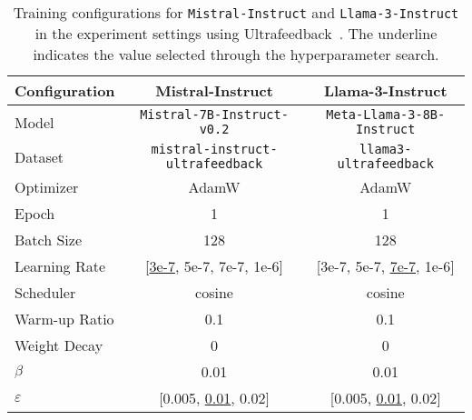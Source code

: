 \begin{table*}[h]
    \centering
    \begin{tabular}{lcc}
        \toprule
        \textbf{Configuration} & \textbf{Mistral-Instruct} & \textbf{Llama-3-Instruct} \\ 
        \midrule
        Model & \texttt{Mistral-7B-Instruct-v0.2} & \texttt{Meta-Llama-3-8B-Instruct} \\
        Dataset & \texttt{mistral-instruct-ultrafeedback} & \texttt{llama3-ultrafeedback} \\
        Optimizer & AdamW & AdamW \\
        Epoch & 1 & 1\\
        Batch Size & 128 & 128 \\
        Learning Rate & [\underline{3e-7}, 5e-7, 7e-7, 1e-6] & [3e-7, 5e-7, \underline{7e-7}, 1e-6] \\
        Scheduler & cosine & cosine \\
        Warm-up Ratio & 0.1 & 0.1 \\
        Weight Decay & 0 & 0 \\
        $\beta$ & 0.01 & 0.01 \\
        $\varepsilon$ & [0.005, \underline{0.01}, 0.02] & [0.005, \underline{0.01}, 0.02] \\
        \bottomrule
    \end{tabular}
    \caption{Training configurations for \texttt{Mistral-Instruct} and \texttt{Llama-3-Instruct} in the experiment settings using Ultrafeedback~\cite{cui2023ultrafeedback}. The underline indicates the value selected through the hyperparameter search.}
    \label{tables:ultrafeedback}
\end{table*}
